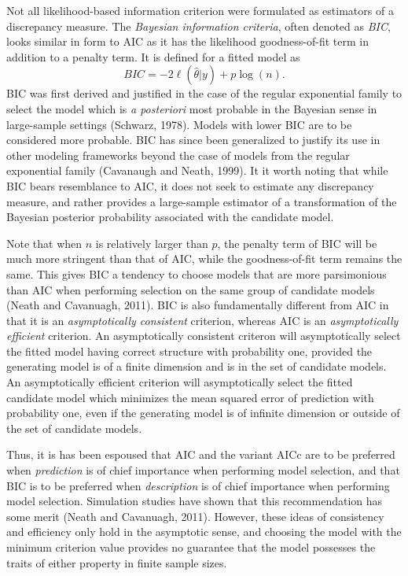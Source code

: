 		Not all likelihood-based information criterion were formulated as estimators of a discrepancy measure. The \textit{Bayesian information criteria}, often denoted as \textit{BIC}, looks similar in
		form to AIC as it has the likelihood goodness-of-fit term in addition to a penalty term. It is defined for a fitted model as
		\begin{equation}
			BIC = -2 \ell(\hat{\theta}|y) + p \log (n).
		\end{equation}
		BIC was first derived and justified in the case of the regular exponential family to select the model which is \textit{a posteriori} most probable in the Bayesian sense in
		large-sample settings (Schwarz, 1978). Models with lower BIC are to be considered more probable. BIC has since been generalized to justify its use in other modeling frameworks beyond
		the case of models from the regular exponential family (Cavanaugh and Neath, 1999). It it worth noting that while BIC bears resemblance to AIC, it does not seek to estimate any discrepancy
		measure, and rather provides a large-sample estimator of a transformation of the Bayesian posterior probability associated with the candidate model.

		Note that when $n$ is relatively larger than $p$, the penalty term of BIC will be much more stringent than that of AIC, while the goodness-of-fit term remains the same. This gives BIC a tendency to
		choose models that are more parsimonious than AIC when performing selection on the same group of candidate models (Neath and Cavanuagh, 2011). BIC is also fundamentally different
		from AIC in that it is an \textit{asymptotically consistent} criterion,  whereas AIC is an \textit{asymptotically efficient} criterion. An asymptotically consistent criteron will asymptotically
		select the fitted model having correct structure with probability one, provided the generating model is of a finite dimension and is in the set of candidate models. An asymptotically efficient
		criterion will asymptotically select the fitted candidate model which minimizes the mean squared error of prediction with probability one, even if the generating model is of infinite dimension
		or outside of the set of candidate models.

		Thus, it is has been espoused that AIC and the variant AICc are to be preferred when \textit{prediction} is of chief importance when performing model selection, and that BIC is to be preferred
		when \textit{description} is of chief importance when performing model selection. Simulation studies have shown that this recommendation has some merit (Neath and Cavanuagh, 2011). However, these
		ideas of consistency and efficiency only hold in the asymptotic sense, and choosing the model with the minimum criterion value provides no guarantee that the model possesses the traits of either
		property in finite sample sizes.
		
